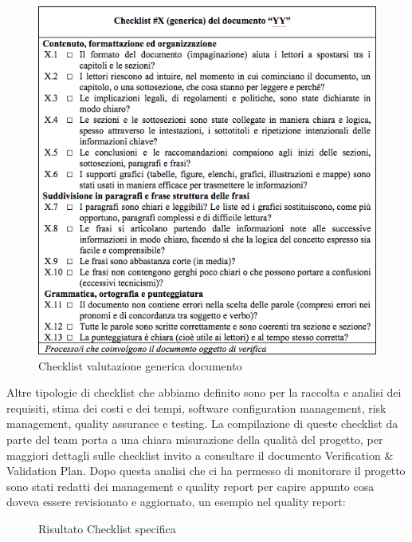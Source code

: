 \begin{figure}[!h]
\centering
\includegraphics[scale=.6]{img/checklist.png}
\caption{Checklist valutazione generica documento}
\end{figure}

 Altre tipologie di checklist che abbiamo definito sono per la raccolta e analisi dei requisiti, stima dei costi e dei tempi, software configuration management, risk management, quality assurance e  testing. La compilazione di queste checklist da parte del team porta a una chiara misurazione della qualità del progetto, per maggiori dettagli sulle checklist invito a consultare il documento Verification \& Validation Plan. Dopo questa analisi che ci ha permesso di monitorare il progetto sono stati redatti dei management e quality report per capire appunto cosa doveva essere revisionato e aggiornato, un esempio nel quality report:\\
 
\begin{figure}[!h]
\centering
{}
\caption{Risultato Checklist specifica}
\end{figure}

